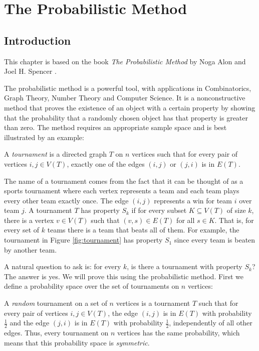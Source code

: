 \chapter{The Probabilistic Method}\label{chap:probmet}

\section{Introduction}\label{sec:probmet:intro}

This chapter is based on the book \textit{The Probabilistic Method} by Noga Alon and Joel H. Spencer \cite{alon2016probabilistic}. \par

The probabilistic method is a powerful tool, with applications in Combinatorics, Graph Theory, Number Theory and Computer Science. It is a nonconstructive method that proves the existence of an object with a certain property by showing that the probability that a randomly chosen object has that property is greater than zero. The method requires an appropriate sample space and is best illustrated by an example: \par

\begin{definition}\label{def:tournament} 
A \textit{tournament} is a directed graph $T$ on $n$ vertices such that for every pair of vertices $i, j \in V(T)$, exactly one of the edges $(i, j)$ or $(j, i)$ is in $E(T)$. 
\end{definition}

The name of a tournament comes from the fact that it can be thought of as a sports tournament where each vertex represents a team and each team plays every other team exactly once. The edge $(i, j)$ represents a win for team $i$ over team $j$. A tournament $T$ has property $S_k$ if for every subset $K \subseteq V(T)$ of size $k$, there is a vertex $v \in V(T)$ such that $(v, s) \in E(T)$ for all $s \in K$. That is, for every set of $k$ teams there is a team that beats all of them. For example, the tournament in Figure \ref{fig:tournament} has property $S_1$ since every team is beaten by another team. \par

A natural question to ask is: for every $k$, is there a tournament with property $S_k$? The answer is yes. We will prove this using the probabilistic method. First we define a probability space over the set of tournaments on $n$ vertices: \par 
A \textit{random} tournament on a set of $n$ vertices is a tournament $T$ such that for every pair of vertices $i, j \in V(T)$, the edge $(i, j)$ is in $E(T)$ with probability $\frac{1}{2}$ and the edge $(j, i)$ is in $E(T)$ with probability $\frac{1}{2}$, independently of all other edges. Thus, every tournament on $n$ vertices has the same probability, which means that this probability space is \textit{symmetric}. \par


